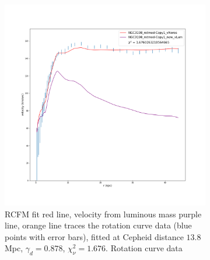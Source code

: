 \documentclass[reprint,%
 amsmath,amssymb,
 aps,
]{revtex4-1}
\begin{document}
 


    

   
   
  
    \begin{figure}[h!] 
    \begin{subfigure}[c]{0.5\linewidth}
    \centering
    \includegraphics[width=0.95\linewidth]{Updated_Graphs_withnewcolorsandfonts/NGC3198_rotmod-Copy1_XueSofue.png}
    \caption{RCFM fit red line,  velocity from   luminous mass   purple line, orange line traces the rotation curve data (blue points with error bars), fitted at Cepheid   distance $13.8$Mpc,  $\gamma_d = 0.878$,   $\chi_\nu^2  =1.676$.  Rotation curve data \cite{2016Lelli} }
    \label{fig:NGC3198RCFM} 
  \end{subfigure}%
  \begin{subfigure}[c]{0.5\linewidth}

\end{subfigure}
\end{figure}
\end{document}
